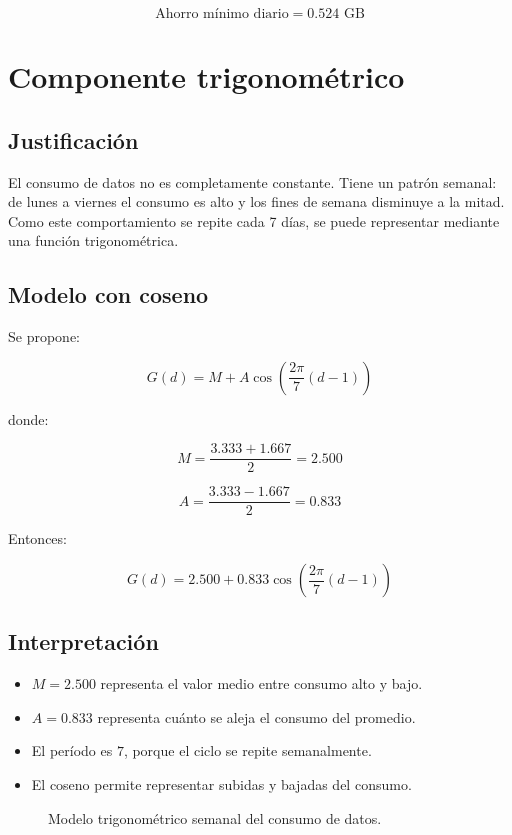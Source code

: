 \documentclass[12pt,a4paper]{article}
\begin{document}
\begin{center}
		\[
		\boxed{\text{Ahorro mínimo diario}=0.524\text{ GB}}
		\]
		
		\section{Componente trigonométrico}
		
		\subsection{Justificación}
		
		El consumo de datos no es completamente constante. Tiene un patrón semanal: de lunes a viernes el consumo es alto y los fines de semana disminuye a la mitad. Como este comportamiento se repite cada 7 días, se puede representar mediante una función trigonométrica.
		
		\subsection{Modelo con coseno}
		
		Se propone:
		
		\[
		G(d)=M+A\cos\left(\frac{2\pi}{7}(d-1)\right)
		\]
		
		donde:
		
		\[
		M=\frac{3.333+1.667}{2}=2.500
		\]
		
		\[
		A=\frac{3.333-1.667}{2}=0.833
		\]
		
		Entonces:
		
		\[
		\boxed{G(d)=2.500+0.833\cos\left(\frac{2\pi}{7}(d-1)\right)}
		\]
		
		\subsection{Interpretación}
		
		\begin{itemize}
			\item $M=2.500$ representa el valor medio entre consumo alto y bajo.
			\item $A=0.833$ representa cuánto se aleja el consumo del promedio.
			\item El período es $7$, porque el ciclo se repite semanalmente.
			\item El coseno permite representar subidas y bajadas del consumo.
		\end{itemize}
		
		\begin{figure}[H]
			\centering
			\caption{Modelo trigonométrico semanal del consumo de datos.}
		\end{figure}
		

\end{center}
\end{document}
